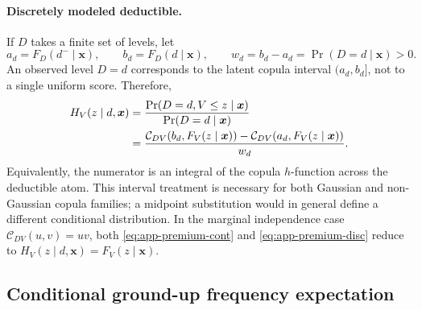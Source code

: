 \documentclass[11pt]{article}
\begin{document}
{\paragraph{Discretely modeled deductible.}
If $D$ takes a finite set of levels, let
\begin{equation}
 a_d=F_D(d^-\mid\boldsymbol{x}),\qquad
 b_d=F_D(d\mid\boldsymbol{x}),\qquad
 w_d=b_d-a_d=\Pr(D=d\mid\boldsymbol{x})>0.
 \label{eq:app-premium-atom}
\end{equation}
An observed level $D=d$ corresponds to the latent copula interval
$(a_d,b_d]$, not to a single uniform score. Therefore,
\begin{align}
 H_V(z\mid d,\boldsymbol{x})
 &=\frac{\Pr(D=d,V\le z\mid\boldsymbol{x})}{\Pr(D=d\mid\boldsymbol{x})}
     \notag\\
 &=\frac{\mathcal C_{DV}\!\left(b_d,F_V(z\mid\boldsymbol{x})\right)
        -\mathcal C_{DV}\!\left(a_d,F_V(z\mid\boldsymbol{x})\right)}{w_d}.
 \label{eq:app-premium-disc}
\end{align}
Equivalently, the numerator is an integral of the copula $h$-function
across the deductible atom. This interval treatment is necessary for both
Gaussian and non-Gaussian copula families; a midpoint substitution would
in general define a different conditional distribution. In the marginal
independence case $\mathcal C_{DV}(u,v)=uv$, both
\eqref{eq:app-premium-cont} and \eqref{eq:app-premium-disc} reduce to
$H_V(z\mid d,\boldsymbol{x})=F_V(z\mid\boldsymbol{x})$.

\subsection{Conditional ground-up frequency expectation}
\label{app:premium-frequency}

}
\end{document}
